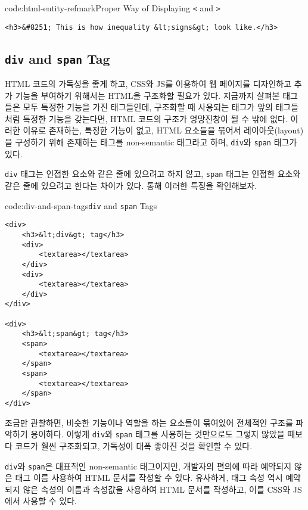 \begin{codeenv}{code:html-entity-refmark}{Proper Way of Displaying \texttt{<} and \texttt{>}}\begin{verbatim}
<h3>&#8251; This is how inequality &lt;signs&gt; look like.</h3>
\end{verbatim}
\end{codeenv}

\subsection*{\texttt{div} and \texttt{span} Tag}
HTML 코드의 가독성을 좋게 하고, CSS와 JS를 이용하여 웹 페이지를 디자인하고 추가 기능을 부여하기 위해서는 HTML을 구조화할 필요가 있다. 지금까지 살펴본 태그들은 모두 특정한 기능을 가진 태그들인데, 구조화할 때 사용되는 태그가 앞의 태그들처럼 특정한 기능을 갖는다면, HTML 코드의 구조가 엉망진창이 될 수 밖에 없다. 이러한 이유로 존재하는, 특정한 기능이 없고, HTML 요소들을 묶어서 레이아웃(layout)을 구성하기 위해 존재하는 태그를 non-semantic 태그라고 하며, \texttt{div}와 \texttt{span} 태그가 있다. 

\texttt{div} 태그는 인접한 요소와 같은 줄에 있으려고 하지 않고, \texttt{span} 태그는 인접한 요소와 같은 줄에 있으려고 한다는 차이가 있다. \를 통해 이러한 특징을 확인해보자.

\begin{codeenv}{code:div-and-span-tags}{\texttt{div} and \texttt{span} Tags}\begin{verbatim}
<div>
    <h3>&lt;div&gt; tag</h3>
    <div>
        <textarea></textarea>
    </div>
    <div>
        <textarea></textarea>
    </div>
</div>

<div>
    <h3>&lt;span&gt; tag</h3>
    <span>
        <textarea></textarea>
    </span>
    <span>
        <textarea></textarea>
    </span>
</div>
\end{verbatim}
\end{codeenv}

\를 조금만 관찰하면, 비슷한 기능이나 역할을 하는 요소들이 묶여있어 전체적인 구조를 파악하기 용이하다. 이렇게 \texttt{div}와 \texttt{span} 태그를 사용하는 것만으로도 그렇지 않았을 때보다 코드가 훨씬 구조화되고, 가독성이 대폭 좋아진 것을 확인할 수 있다. 

\texttt{div}와 \texttt{span}은 대표적인 non-semantic 태그이지만, 개발자의 편의에 따라 예약되지 않은 태그 이름 사용하여 HTML 문서를 작성할 수 있다. 유사하게, 태그 속성 역시 예약되지 않은 속성의 이름과 속성값을 사용하여 HTML 문서를 작성하고, 이를 CSS와 JS에서 사용할 수 있다.
